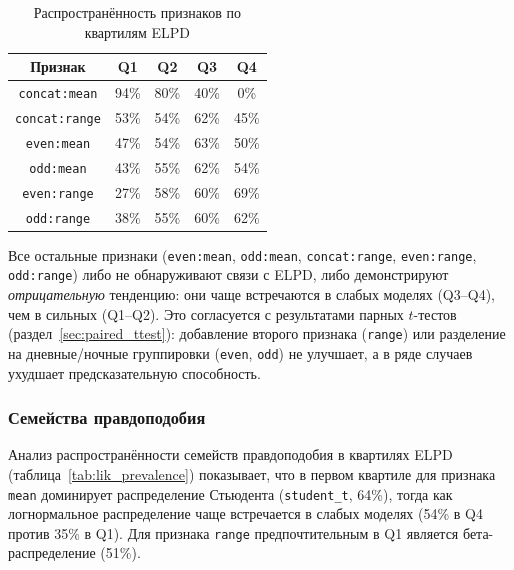 \documentclass[14pt]{mmcs_article}
\begin{document}
\begin{table}[H]
	\centering
	\caption{Распространённость признаков по квартилям ELPD}
	\label{tab:feature_prevalence}
	\begin{tabular}{|c|c|c|c|c|}
		\hline
		\textbf{Признак} & \textbf{Q1} & \textbf{Q2} & 
		\textbf{Q3} & \textbf{Q4} \\
		\hline
		\texttt{concat:mean} & 94\% & 80\% & 40\% & 0\% \\
		\hline
		\texttt{concat:range} & 53\% & 54\% & 62\% & 45\% \\
		\hline
		\texttt{even:mean} & 47\% & 54\% & 63\% & 50\% \\
		\hline
		\texttt{odd:mean} & 43\% & 55\% & 62\% & 54\% \\
		\hline
		\texttt{even:range} & 27\% & 58\% & 60\% & 69\% \\
		\hline
		\texttt{odd:range} & 38\% & 55\% & 60\% & 62\% \\
		\hline
	\end{tabular}
\end{table}

Все остальные признаки (\texttt{even:mean}, \texttt{odd:mean},
\texttt{concat:range}, \texttt{even:range}, \texttt{odd:range})
либо не обнаруживают связи с ELPD, либо демонстрируют
\textit{отрицательную} тенденцию: они чаще встречаются в
слабых моделях (Q3--Q4), чем в сильных (Q1--Q2). Это
согласуется с результатами парных $t$-тестов
(раздел~\ref{sec:paired_ttest}): добавление второго признака
(\texttt{range}) или разделение на дневные/ночные группировки
(\texttt{even}, \texttt{odd}) не улучшает, а в ряде случаев
ухудшает предсказательную способность.

\subsubsection*{Семейства правдоподобия}

Анализ распространённости семейств правдоподобия в квартилях
ELPD (таблица~\ref{tab:lik_prevalence}) показывает, что в
первом квартиле для признака \texttt{mean} доминирует
распределение Стьюдента (\texttt{student\_t}, 64\%), тогда как
логнормальное распределение чаще встречается в слабых моделях
(54\% в Q4 против 35\% в Q1). Для признака \texttt{range}
предпочтительным в Q1 является бета-распределение (51\%).
\end{document}

